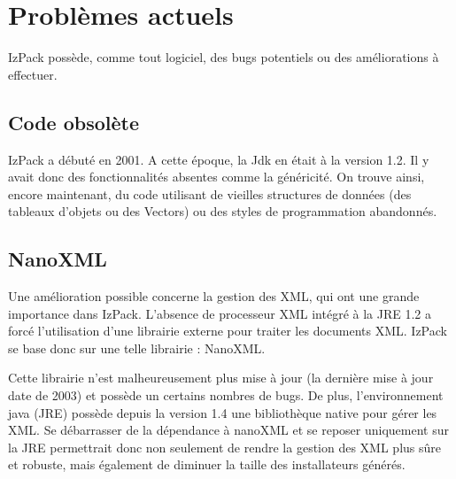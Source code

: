 \section{Problèmes actuels}
IzPack possède, comme tout logiciel, des bugs potentiels ou des améliorations à effectuer.
\subsection{Code obsolète}
IzPack a débuté en 2001.
A cette époque, la Jdk en était à la version 1.2. Il y avait donc des fonctionnalités absentes comme la généricité.
On trouve ainsi, encore maintenant, du code utilisant de vieilles structures de données (des tableaux d'objets ou des Vectors) ou des styles de programmation abandonnés.
\subsection{NanoXML}
Une amélioration possible concerne la gestion des XML, qui ont une grande importance dans IzPack.
L'absence de processeur XML intégré à la JRE 1.2 a forcé l'utilisation d'une librairie externe pour traiter les documents XML.
IzPack se base donc sur une telle librairie : NanoXML.

Cette librairie n'est malheureusement plus mise à jour (la dernière mise à jour date de 2003) et possède un certains nombres de bugs.
De plus, l'environnement java (JRE) possède depuis la version 1.4 une bibliothèque native pour gérer les XML.
Se débarrasser de la dépendance à nanoXML et se reposer uniquement sur la JRE permettrait donc non seulement de rendre la gestion des XML plus sûre et robuste, mais également de diminuer la taille des installateurs générés.